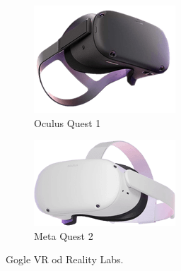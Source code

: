 \documentclass[a4paper,12pt,reqno]{article}
\begin{document}
\begin{figure}[!ht]%
	\centering
	\begin{subfigure}{.5\textwidth}
		\centering
		\includegraphics[width=0.8\linewidth]{graphics/oculusquest.png}
		\caption{Oculus Quest 1}	
		\label{ref:subref_a}
	\end{subfigure}%
	\begin{subfigure}{.5\textwidth}
		\centering
		\includegraphics[width=0.8\linewidth]{graphics/oculusquest2.png}
		\caption{Meta Quest 2}
		\label{ref:subref_b}
	\end{subfigure}%
	

\caption{Gogle VR od Reality Labs. \cite{ilosc_urzadzen}}
\label{ref:ref}
\end{figure}
\end{document}
